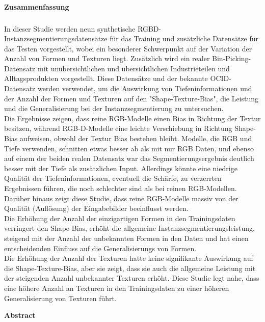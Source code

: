 \cleardoublepage

\thispagestyle{empty}
\textsf{\large\textbf{Zusammenfassung}}
\subsubsection*{\hsmatitelde}%
In dieser Studie werden neun synthetische RGBD-Instanzsegmentierungsdatensätze für das Training und zusätzliche Datensätze für das Testen vorgestellt, wobei ein besonderer Schwerpunkt auf der Variation der Anzahl von Formen und Texturen liegt. Zusätzlich wird ein realer Bin-Picking-Datensatz mit unübersichtlichen und übersichtlichen Industrieteilen und Alltagsprodukten vorgestellt. Diese Datensätze und der bekannte OCID-Datensatz werden verwendet, um die Auswirkung von Tiefeninformationen und der Anzahl der Formen und Texturen auf den "Shape-Texture-Bias", die Leistung und die Generalisierung bei der Instanzsegmentierung zu untersuchen.\\
Die Ergebnisse zeigen, dass reine RGB-Modelle einen Bias in Richtung der Textur besitzen, während RGB-D-Modelle eine leichte Verschiebung in Richtung Shape-Bias aufweisen, obwohl der Textur Bias bestehen bleibt. Modelle, die RGB und Tiefe verwenden, schnitten etwas besser ab als mit nur RGB Daten, und ebenso auf einem der beiden realen Datensatz war das Segmentierungsergebnis deutlich besser mit der Tiefe als zusätzlichen Input. Allerdings könnte eine niedrige Qualität der Tiefeninformationen, eventuell die Schärfe, zu verzerrten Ergebnissen führen, die noch schlechter sind als bei reinen RGB-Modellen. Darüber hinaus zeigt diese Studie, dass reine RGB-Modelle massiv von der Qualität (Auflösung) der Eingabebilder beeinflusst werden.\\
Die Erhöhung der Anzahl der einzigartigen Formen in den Trainingsdaten verringert den Shape-Bias, erhöht die allgemeine Instanzsegmentierungsleistung, steigend mit der Anzahl der unbekannten Formen in den Daten und hat einen entscheidenden Einfluss auf die Generalisierungs von Formen. \\
Die Erhöhung der Anzahl der Texturen hatte keine signifikante Auswirkung auf die Shape-Texture-Bias, aber sie zeigt, dass sie auch die allgemeine Leistung mit der steigenden Anzahl unbekannter Texturen erhöht. Diese Studie legt nahe, dass eine höhere Anzahl an Texturen in den Trainingsdaten zu einer höheren Generalisierung von Texturen führt.

\clearpage
\thispagestyle{empty}
\textsf{\large\textbf{Abstract}}
\subsubsection*{\hsmatitelen}%

